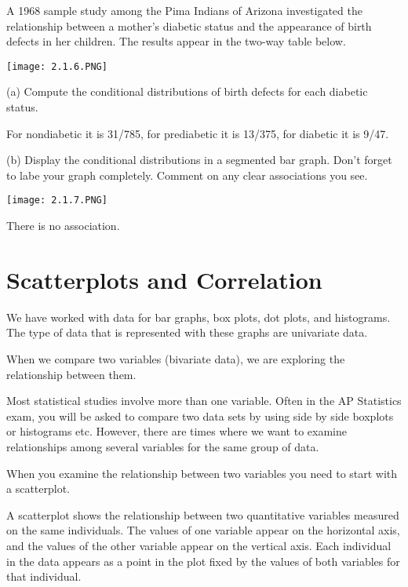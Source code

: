 \documentclass[../stats.tex]{subfiles}
\begin{document}
\begin{example}
    A 1968 sample study among the Pima Indians of Arizona investigated the relationship between a mother's diabetic status and the appearance of birth defects in her children. The results appear in the two-way table below.
    \begin{center}
        \texttt{[image: 2.1.6.PNG]}
    \end{center}

    (a) Compute the conditional distributions of birth defects for each diabetic status.

    For nondiabetic it is 31/785, for prediabetic it is 13/375, for diabetic it is 9/47.

    (b) Display the conditional distributions in a segmented bar graph. Don't forget to labe your graph completely. Comment on any clear associations you see.
    \begin{center}
        \texttt{[image: 2.1.7.PNG]}
    \end{center}
    There is no association.
\end{example}

\section{Scatterplots and Correlation}
We have worked with data for bar graphs, box plots, dot plots, and histograms. The type of data that is represented with these graphs are univariate data.

When we compare two variables (bivariate data), we are exploring the relationship between them.

Most statistical studies involve more than one variable. Often in the AP Statistics exam, you will be asked to compare 
two data sets by using side by side boxplots or histograms etc. However, there are times where we want to examine relationships among several variables for the same group of data.

When you examine the relationship between two variables you need to start with a scatterplot.

A scatterplot shows the relationship between two quantitative variables measured on the same individuals. The values of one variable appear on the horizontal axis, and the values 
of the other variable appear on the vertical axis. Each individual in the data appears as a point in the plot fixed by the values of both variables for that individual.
\end{document}
